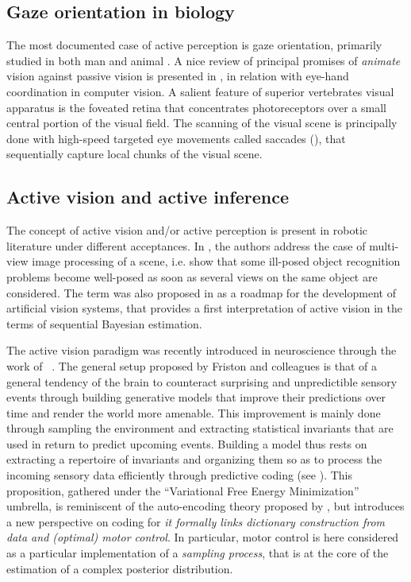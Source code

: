 \documentclass{article} %
\begin{document}
	\subsection{Gaze orientation in biology}
	
	The most documented case of active perception is gaze orientation, primarily studied in both man and animal \cite{yarbus1967eye,robinson1968eye}. A nice review of principal promises of \emph{animate} vision against passive vision  is presented in \cite{ballard1991animate},  in relation with eye-hand coordination in computer vision.
	A salient feature of superior vertebrates visual apparatus is the foveated retina that concentrates  photoreceptors over a small central portion of the visual field.
	 The scanning of the visual scene is principally done with high-speed targeted eye movements called saccades (\cite{yarbus1967eye}), that sequentially capture local chunks of the visual scene. 
	
	\subsection{Active vision and active inference}	
	
	The concept of active vision and/or active perception is present in robotic literature under different acceptances. In \cite{aloimonos1988active}, the authors address the case of multi-view image processing of a scene, i.e. show that some ill-posed object recognition problems become well-posed as soon as several views on the  same object are considered. The term was also proposed in \cite{bajcsy1988active} as a roadmap for the development of artificial vision systems, that provides a first interpretation of active vision in the terms of sequential Bayesian estimation.
	
The active vision paradigm was recently introduced in neuroscience through the work of ~\cite{friston2010free,friston2012perceptions}. %
The general setup proposed by Friston and colleagues is that of a general tendency of the brain to counteract surprising and unpredictible sensory events through building generative models that improve their predictions over time and render the world more amenable. This improvement is mainly done through sampling the environment and extracting statistical invariants that are used in return to predict upcoming events.
Building a model thus rests on extracting a repertoire of invariants and organizing them so as to process the incoming sensory data efficiently through predictive coding (see \cite{rao1999predictive}). This proposition, gathered under the ``Variational Free Energy Minimization'' umbrella, is reminiscent of the auto-encoding theory proposed by \cite{hinton1994autoencoders}, but introduces a new perspective on coding
for \emph{it formally links dictionary construction from data and (optimal) motor control}.
In particular, motor control is here considered as a particular implementation of a \emph{sampling process}, that is at the core of the estimation of a complex posterior distribution. 
\end{document}
